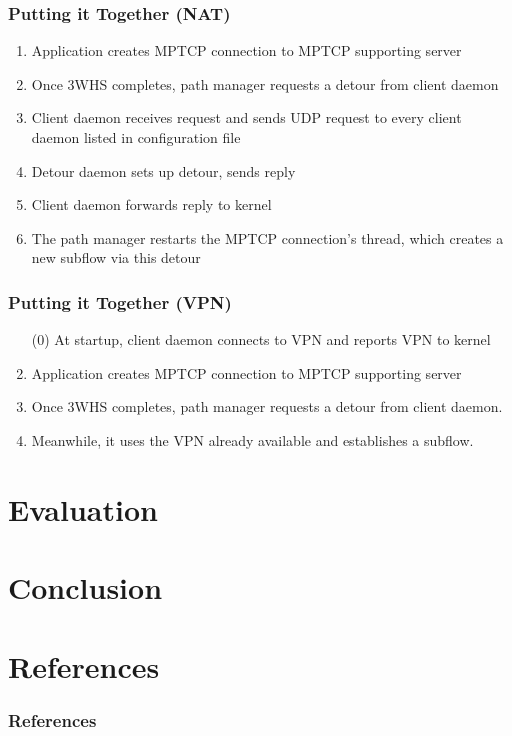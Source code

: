 \documentclass{beamer}
\begin{document}
\begin{frame}[t]
  \frametitle{Putting it Together (NAT)}
  \begin{enumerate}
  \item Application creates MPTCP connection to MPTCP supporting server
  \item Once 3WHS completes, path manager requests a detour from client daemon
  \item Client daemon receives request and sends UDP request to every client
    daemon listed in configuration file
  \item Detour daemon sets up detour, sends reply
  \item Client daemon forwards reply to kernel
  \item The path manager restarts the MPTCP connection's thread, which creates
    a new subflow via this detour
  \end{enumerate}
\end{frame}

\begin{frame}[t]
  \frametitle{Putting it Together (VPN)}

  \begin{enumerate}
  \item[(0)] At startup, client daemon connects to VPN and reports VPN to kernel
  \item Application creates MPTCP connection to MPTCP supporting server
  \item Once 3WHS completes, path manager requests a detour from client daemon.
  \item Meanwhile, it uses the VPN already available and establishes a subflow.
  \end{enumerate}
\end{frame}

\section{Evaluation}
\section{Conclusion}

\appendix %

\section{References}
\begin{frame}[allowframebreaks]
  \frametitle{References}
  
  
\end{frame}
\end{document}
